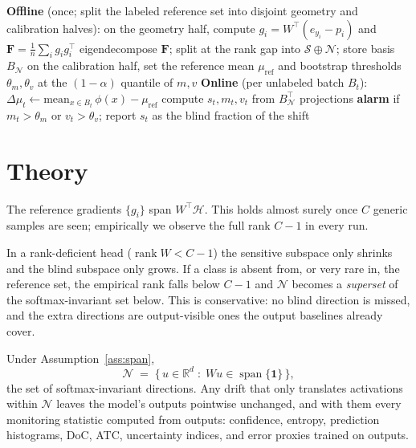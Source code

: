 \documentclass[graybox]{SNmult}
\newcommand{\R}{\mathbb{R}}
\newcommand{\F}{\mathbf{F}}
\newcommand{\act}{\phi}
\DeclareMathOperator{\rank}{rank}
\DeclareMathOperator{\spn}{span}
\begin{document}
\begin{algorithm}[t]
\caption{FEATHER}
\label{alg:feather}
\begin{algorithmic}[1]
\Statex \textbf{Offline} (once; split the labeled reference set into disjoint
       geometry and calibration halves):
\State on the geometry half, compute $g_i = W^\top(e_{y_i} - p_i)$ and
       $\F = \frac{1}{n}\sum_i g_i g_i^\top$
\State eigendecompose $\F$; split at the rank gap into
       $\mathcal{S} \oplus \mathcal{N}$; store basis $B_\mathcal{N}$
\State on the calibration half, set the reference mean $\mu_{\mathrm{ref}}$ and
       bootstrap thresholds $\theta_m, \theta_v$ at the $(1-\alpha)$ quantile
       of $m, v$
\Statex \textbf{Online} (per unlabeled batch $B_t$):
\State $\Delta\mu_t \gets \mathrm{mean}_{x \in B_t}\,\act(x) - \mu_{\mathrm{ref}}$
\State compute $s_t, m_t, v_t$ from $B_\mathcal{N}^\top$ projections
\State \textbf{alarm} if $m_t > \theta_m$ or $v_t > \theta_v$;
       report $s_t$ as the blind fraction of the shift
\end{algorithmic}
\end{algorithm}

\section{Theory}
\label{sec:theory}

\begin{assumption}
\label{ass:span}
The reference gradients $\{g_i\}$ span $W^\top\!\mathcal{H}$. This holds
almost surely once $C$ generic samples are seen; empirically we observe the
full rank $C-1$ in every run.
\end{assumption}

In a rank-deficient head ($\rank W < C-1$) the sensitive subspace only shrinks
and the blind subspace only grows. If a class is absent from, or very rare in,
the reference set, the empirical rank falls below $C-1$ and $\mathcal{N}$
becomes a \emph{superset} of the softmax-invariant set below. This is
conservative: no blind direction is missed, and the extra directions are
output-visible ones the output baselines already cover.

\begin{proposition}
\label{prop:blind}
Under Assumption~\ref{ass:span},
\[
  \mathcal{N} \;=\; \{\, u \in \R^d \;:\; Wu \in \spn\{\mathbf{1}\} \,\},
\]
the set of softmax-invariant directions. Any drift that only translates
activations within $\mathcal{N}$ leaves the model's outputs pointwise
unchanged, and with them every monitoring statistic computed from outputs:
confidence, entropy, prediction histograms, DoC, ATC, uncertainty indices,
and error proxies trained on outputs.
\end{proposition}
\end{document}

